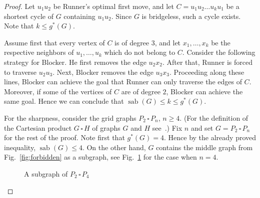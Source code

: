 \documentclass[10pt,a4paper]{amsart}
\newcommand{\cp}{\,\square\,}
\DeclareMathOperator{\sab}{\mathrm{sab}}
\begin{document}
\begin{proof}
Let $u_1u_2$ be Runner's optimal first move, and let $C = u_1u_2\ldots u_ku_1$ be a shortest cycle of $G$ containing $u_1u_2$. Since $G$ is bridgeless, such a cycle exists. Note that $k\le g^\ast(G)$. 

Assume first that every vertex of $C$ is of degree $3$, and let $x_1, \dots, x_k$ be the respective neighbors of $u_1, \dots, u_k$ which do not belong to $C$. Consider the following strategy for Blocker. He first removes the edge $u_2x_2$. After that, Runner is forced to traverse $u_2u_3$. Next, Blocker removes the edge $u_3x_3$. Proceeding along these lines, Blocker can achieve the goal that Runner can only traverse the edges of $C$. Moreover, if some of the vertices of $C$ are of degree $2$, Blocker can achieve the same goal. Hence we can conclude that $\sab(G) \le k \le g^\ast(G)$.

For the sharpness, consider the grid graphs $P_2\cp P_n$, $n\ge 4$. (For the definition of the Cartesian product $G\cp H$ of graphs $G$ and $H$ see~\cite{hammack-2011}.) Fix $n$ and set $G = P_2\cp P_n$ for the rest of the proof. Note first that $g^\ast(G) = 4$. Hence by the already proved inequality, $\sab(G) \le 4$. On the other hand, $G$ contains the middle graph from Fig.~\ref{fig:forbidden} as a subgraph, see Fig.~\ref{fig:p2-4-subgraph} for the case when $n=4$. 

\begin{figure}[ht!]
    \centering
{}
\caption{A subgraph of $P_2\cp P_4$}
\label{fig:p2-4-subgraph}
\end{figure}


\end{proof}
\end{document}
